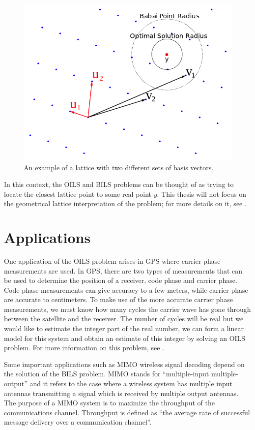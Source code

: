 \documentclass[12pt,Bold,letterpaper]{mcgilletdclass}
\newcommand{\vsp}{\vspace{\baselineskip}}
\begin{document}
\begin{figure}
\centering
\includegraphics[scale=0.4]{latticebasis.png}
\caption{An example of a lattice with two different sets of basis vectors.}
\label{fig:latticeBasis}
\end{figure}

In this context, the OILS and BILS problems can be thought of as trying to locate the closest lattice point to some real point $y$. This thesis will not focus on the geometrical lattice interpretation of the problem; for more details on it, see \cite{AgrEVZ02}.

\vsp \section{Applications}
One application of the OILS problem arises in GPS where carrier phase measurements are used. In GPS, there are two types of measurements that can be used to determine the position of a receiver, code phase and carrier phase. Code phase measurements can give accuracy to a few meters, while carrier phase are accurate to centimeters. To make use of the more accurate carrier phase measurements, we must know how many cycles the carrier wave has gone through between the satellite and the receiver. The number of cycles will be real but we would like to estimate the integer part of the real number, we can form a linear model for this system and obtain an estimate of this integer by solving an OILS problem. For more information on this problem, see \cite{Xu07}. 

Some important applications such as MIMO wireless signal decoding depend on the
solution of the BILS problem. MIMO stands for ``multiple-input
multiple-output'' and it refers to the case where a wireless system has multiple
input antennas transmitting a signal which is received by multiple output
antennas. The purpose of a MIMO system is to maximize the throughput of the communications channel. Throughput is defined as ``the average rate of successful message delivery over a communication channel''. 
\end{document}
